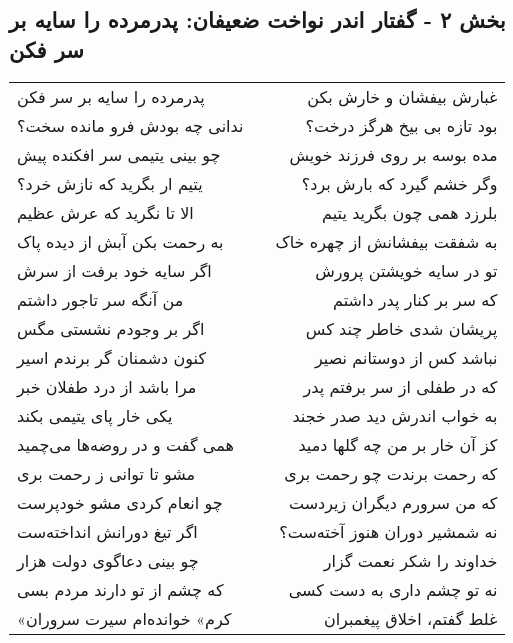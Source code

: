 \begin{center}
\section*{بخش ۲ - گفتار اندر نواخت ضعیفان: پدرمرده را سایه بر سر فکن}
\label{sec:002}
\begin{longtable}{l p{0.5cm} r}
پدرمرده را سایه بر سر فکن
&&
غبارش بیفشان و خارش بکن
\\
ندانی چه بودش فرو مانده سخت؟
&&
بود تازه بی بیخ هرگز درخت؟
\\
چو بینی یتیمی سر افکنده پیش
&&
مده بوسه بر روی فرزند خویش
\\
یتیم ار بگرید که نازش خرد؟
&&
وگر خشم گیرد که بارش برد؟
\\
الا تا نگرید که عرش عظیم
&&
بلرزد همی چون بگرید یتیم
\\
به رحمت بکن آبش از دیده پاک
&&
به شفقت بیفشانش از چهره خاک
\\
اگر سایه خود برفت از سرش
&&
تو در سایه خویشتن پرورش
\\
من آنگه سر تاجور داشتم
&&
که سر بر کنار پدر داشتم
\\
اگر بر وجودم نشستی مگس
&&
پریشان شدی خاطر چند کس
\\
کنون دشمنان گر برندم اسیر
&&
نباشد کس از دوستانم نصیر
\\
مرا باشد از درد طفلان خبر
&&
که در طفلی از سر برفتم پدر
\\
یکی خار پای یتیمی بکند
&&
به خواب اندرش دید صدر خجند
\\
همی گفت و در روضه‌ها می‌چمید
&&
کز آن خار بر من چه گلها دمید
\\
مشو تا توانی ز رحمت بری
&&
که رحمت برندت چو رحمت بری
\\
چو انعام کردی مشو خودپرست
&&
که من سرورم دیگران زیردست
\\
اگر تیغ دورانش انداخته‌ست
&&
نه شمشیر دوران هنوز آخته‌ست؟
\\
چو بینی دعاگوی دولت هزار
&&
خداوند را شکر نعمت گزار
\\
که چشم از تو دارند مردم بسی
&&
نه تو چشم داری به دست کسی
\\
«کرم» خوانده‌ام سیرت سروران
&&
غلط گفتم، اخلاق پیغمبران
\\
\end{longtable}
\end{center}

